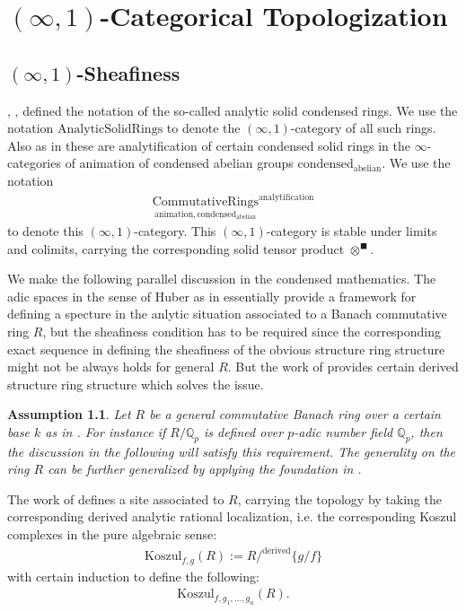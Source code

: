 \documentclass[12pt]{book}
\newtheorem{assumption}{Assumption}
\begin{document}
\chapter{$(\infty,1)$-Categorical Topologization}

 

\newpage
\section{$(\infty,1)$-Sheafiness}

\noindent \cite{CS1}, \cite{CS2}, \cite{CS3} defined the notation of the so-called analytic solid condensed rings. We use the notation $\mathrm{AnalyticSolidRings}$ to denote the $(\infty,1)$-category of all such rings. Also as in \cite{CS2} these are analytification of certain condensed solid rings in the $\infty$-categories of animation of condensed abelian groups $\mathrm{condensed}_\mathrm{abelian}$. We use the notation 
\begin{align}
{\underset{\mathrm{animation},\mathrm{condensed}_\mathrm{abelian}}{\mathrm{CommutativeRings}}}^{\mathrm{analytification}}
\end{align}
to denote this $(\infty,1)$-category. This $(\infty,1)$-category is stable under limits and colimits, carrying the corresponding solid tensor product $\otimes^\blacksquare$.


\indent We make the following parallel discussion in the condensed mathematics. The adic spaces in the sense of Huber as in \cite{Hu} essentially provide a framework for defining a specture in the anlytic situation associated to a Banach commutative ring $R$, but the sheafiness condition has to be required since the corresponding exact sequence in defining the sheafiness of the obvious structure ring structure might not be always holds for general $R$. But the work of \cite{CS2} provides certain derived structure ring structure which solves the issue. 

\begin{assumption}
Let $R$ be a general commutative Banach ring over a certain base $k$ as in \cite{BK}. For instance if $R/\mathbb{Q}_p$ is defined over $p$-adic number field $\mathbb{Q}_p$, then the discussion in the following will satisfy this requirement. The generality on the ring $R$ can be further generalized by applying the foundation in \cite{Ked1}.
\end{assumption}

\noindent The work of \cite{CS2} defines a site associated to $R$, carrying the topology by taking the corresponding derived analytic rational localization, i.e. the corresponding Koszul complexes in the pure algebraic sense:
\begin{align}
\mathrm{Koszul}_{f,g}(R):=R/^\mathrm{derived}\{g/f\}
\end{align}
with certain induction to define the following:
\begin{align}
\mathrm{Koszul}_{f,g_1,...,g_n}(R).
\end{align}
\end{document}
